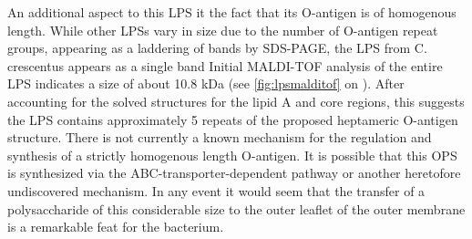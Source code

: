 	An additional aspect to this \ac{LPS} it the fact that its O-antigen is of homogenous length. While other \ac{LPS}s vary in size due to the number of O-antigen repeat groups, appearing as a laddering of bands by \ac{SDS-PAGE}, the \ac{LPS} from C. crescentus appears as a single band Initial \ac{MALDI-TOF} analysis of the entire \ac{LPS} indicates a size of about 10.8 kDa (see \cref{fig:lpsmalditof} on ).
	After accounting for the solved structures for the lipid A and core regions, this suggests the \ac{LPS} contains approximately 5 repeats of the proposed heptameric O-antigen structure.  There is not currently a known mechanism for the regulation and synthesis of a strictly homogenous length O-antigen. It is possible that this \ac{OPS} is synthesized via the \ac{ABC}-transporter-dependent pathway or another heretofore undiscovered mechanism. In any event it would seem that the transfer of a polysaccharide of this considerable size to the outer leaflet of the outer membrane is a remarkable feat for the bacterium.
 
